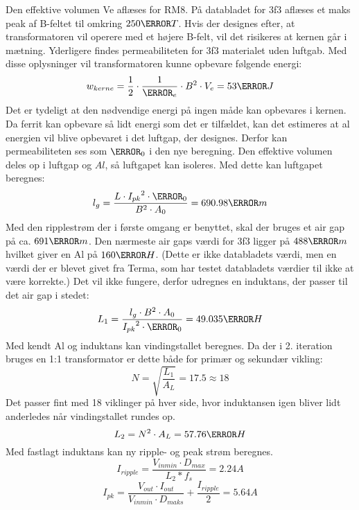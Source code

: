 \noindent Den effektive volumen Ve aflæses for RM8. På databladet for 3f3 aflæses et maks peak af B-feltet til omkring $250\milli T$. Hvis der designes efter, at transformatoren vil operere med et højere B-felt, vil det risikeres at kernen går i mætning. Yderligere findes permeabiliteten for 3f3 materialet uden luftgab. Med disse oplysninger vil transformatoren kunne opbevare følgende energi:
\begin{equation} \label{Energy_no_gap}
w_{kerne} = \frac{1} {2} \cdot \frac{1}{\micro_e} \cdot B^2 \cdot V_e = 53\pico J
\end{equation}
Det er tydeligt at den nødvendige energi på ingen måde kan opbevares i kernen. Da ferrit kan opbevare så lidt energi som det er tilfældet, kan det estimeres at al energien vil blive opbevaret i det luftgap, der designes. Derfor kan permeabiliteten ses som $\micro_0$ i den nye beregning. Den effektive volumen deles op i luftgap og $Al$, så luftgapet kan isoleres. Med dette kan luftgapet beregnes: 
\begin{equation} \label{Airgap}
l_g = \frac{L \cdot {I_{pk}}^2 \cdot \micro_0}{B^2 \cdot A_0} = 690.98\micro m
\end{equation}
Med den ripplestrøm der i første omgang er benyttet, skal der bruges et air gap på ca. $691\micro m$. Den nærmeste air gaps værdi for 3f3 ligger på $488\micro m$ hvilket giver en Al på $160\nano H$. (Dette er ikke databladets værdi, men en værdi der er blevet givet fra Terma, som har testet databladets værdier til ikke at være korrekte.) Det vil ikke fungere, derfor udregnes en induktans, der passer til det air gap i stedet: 
\begin{equation}
L_1 = \frac{l_g \cdot B^2 \cdot A_0}{{I_{pk}}^2 \cdot \micro_0} = 49.035\micro H
\end{equation}
Med kendt Al og induktans kan vindingstallet beregnes. Da der i 2. iteration bruges en 1:1 transformator er dette både for primær og sekundær vikling:
\begin{equation} \label{N}
N = \sqrt{\frac{L_1}{A_L}} = 17.5 \approx 18
\end{equation}
Det passer fint med 18 viklinger på hver side, hvor induktansen igen bliver lidt anderledes når vindingstallet rundes op. 
\begin{equation} \label{L1}
L_2 = N^2 \cdot A_L = 57.76 \micro H
\end{equation}
Med fastlagt induktans kan ny ripple- og peak strøm beregnes.
\begin{equation}
I_{ripple} = \frac{V_{inmin} \cdot D_{max}}{L_2*f_s} = 2.24A
\end{equation}
\begin{equation}
I_{pk} = \frac{V_{out} \cdot I_{out}}{V_{inmin} \cdot D_{maks}} + \frac{I_{ripple}}{2} = 5.64A
\end{equation}

